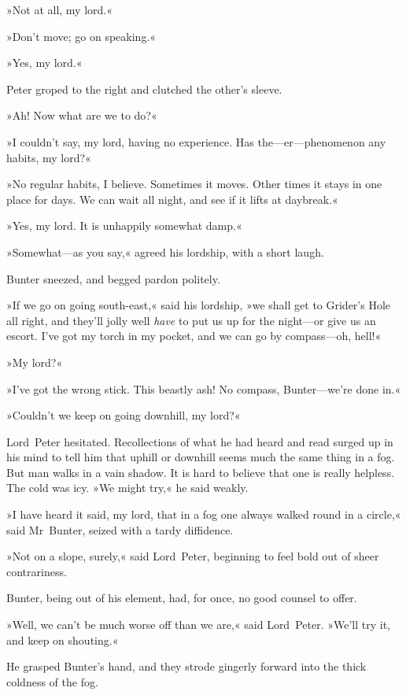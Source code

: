 »Not at all, my lord.«

»Don't move; go on speaking.«

»Yes, my lord.«

Peter groped to the right and clutched the other's sleeve.

»Ah! Now what are we to do?«

»I couldn't say, my lord, having no experience. Has the—er—\newline phenomenon any habits, my lord?«

»No regular habits, I believe. Sometimes it moves. Other times it stays in one place for days. We can wait all night, and see if it lifts at daybreak.«

»Yes, my lord. It is unhappily somewhat damp.«

»Somewhat—as you say,« agreed his lordship, with a short laugh.

Bunter sneezed, and begged pardon politely.

»If we go on going south-east,« said his lordship, »we shall get to Grider's Hole all right, and they'll jolly well \textit{have} to put us up for the night—or give us an escort. I've got my torch in my pocket, and we can go by compass—oh, hell!«

»My lord?«

»I've got the wrong stick. This beastly ash! No compass, Bunter—we're done in.«

»Couldn't we keep on going downhill, my lord?«

Lord~Peter hesitated. Recollections of what he had heard and read surged up in his mind to tell him that uphill or downhill seems much the same thing in a fog. But man walks in a vain shadow. It is hard to believe that one is really helpless. The cold was icy. »We might try,« he said weakly.

»I have heard it said, my lord, that in a fog one always walked round in a circle,« said Mr~Bunter, seized with a tardy diffidence.

»Not on a slope, surely,« said Lord~Peter, beginning to feel bold out of sheer contrariness.

Bunter, being out of his element, had, for once, no good counsel to offer.

»Well, we can't be much worse off than we are,« said Lord~Peter. »We'll try it, and keep on shouting.«

He grasped Bunter's hand, and they strode gingerly forward into the thick coldness of the fog.

